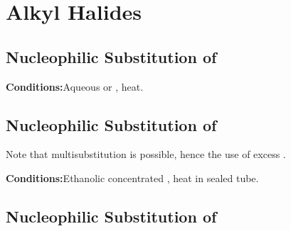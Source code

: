 




	\pagebreak
	\section{Alkyl Halides}

		\subsection{Nucleophilic Substitution of }

			\vspace{1.5em}
			\vbox{\textbf{Conditions:}\tabto{35mm}Aqueous  or , heat.}

			\diagram[1.0]{
				\schemestart[0, 1.5, thick]
					\chemfig{!\molR-[:0]!\molX}
					\hspace{2mm} + \hspace{2mm}
					\chemfig{!\molOH\mch}
					\arrow
					\chemfig{!\molR-[:0]!\molOH}
					\hspace{2mm} + \hspace{2mm}
					\chemfig{!\molX\mch}
				\schemestop
			}




		\subsection{Nucleophilic Substitution of }

			Note that multisubstitution is possible, hence the use of excess .

			\vspace{1.5em}
			\vbox{\textbf{Conditions:}\tabto{35mm}Ethanolic concentrated , heat in sealed tube.}





		\subsection{Nucleophilic Substitution of }

